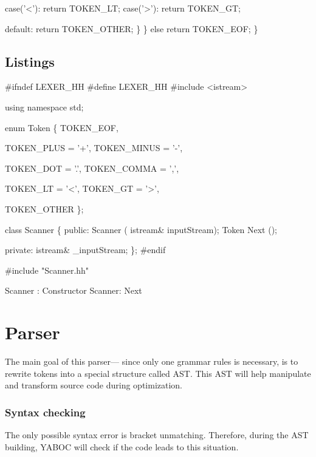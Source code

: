                         case('<'): return TOKEN_LT;
                        case('>'): return TOKEN_GT;

                        default: return TOKEN_OTHER;
                \}
        \} else return TOKEN_EOF;
\}
\nwendcode{}\nwdocspar

\subsection{Listings}
\nwenddocs{}\endmoddef\nwstartdeflinemarkup\nwenddeflinemarkup
#ifndef LEXER_HH
#define LEXER_HH
#include <istream>

using namespace std;

enum Token \{
        TOKEN_EOF,

        TOKEN_PLUS      = '+',
        TOKEN_MINUS     = '-',

        TOKEN_DOT       = '.',
        TOKEN_COMMA     = ',',

        TOKEN_LT        = '<',
        TOKEN_GT        = '>',

        TOKEN_OTHER
\};

class Scanner \{
        public:
                Scanner ( istream& inputStream);
                Token Next ();

        private:
                istream& _inputStream;
\};
#endif
\nwendcode{}\nwdocspar

\nwenddocs{}\endmoddef\nwstartdeflinemarkup\nwenddeflinemarkup
#include "Scanner.hh"

\LA{}Scanner : Constructor\RA{}
\LA{}Scanner: Next\RA{}
\nwendcode{}\nwdocspar
\nwenddocs{}\section{Parser}
The main goal of this parser--- since only one grammar rules is necessary, is to rewrite tokens into a special structure called \gls{AST}. This \gls{AST} will help manipulate and transform source code during optimization. 

\subsubsection{Syntax checking}
The only possible syntax error is bracket unmatching. Therefore, during the \gls{AST} building, YABOC will check if the code leads to this situation.

